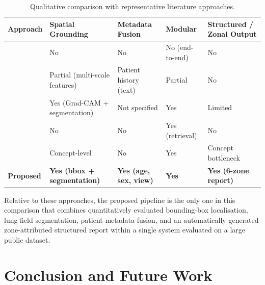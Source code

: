 \documentclass[preprint,12pt,authoryear]{elsarticle}
\begin{document}
\begin{table}[ht]
\centering
\caption{Qualitative comparison with representative literature approaches.}
\label{tab:qualitative_comparison}
\renewcommand{\arraystretch}{1.3}
\begin{tabular}{p{3.0cm}p{2.0cm}p{2.0cm}p{2.0cm}p{3.0cm}}
\toprule
\textbf{Approach} & \textbf{Spatial Grounding} & \textbf{Metadata Fusion} & \textbf{Modular} & \textbf{Structured / Zonal Output} \\
\midrule
\citet{yang_knowledge} & No & No & No (end-to-end) & No \\
\citet{mmg_fusion} & Partial (multi-scale features) & Patient history (text) & Partial & No \\
\citet{ihras} & Yes (Grad-CAM + segmentation) & Not specified & Yes & Limited \\
\citet{xrem} & No & No & Yes (retrieval) & No \\
\citet{concept_rag} & Concept-level & No & Yes & Concept bottleneck \\
\textbf{Proposed} & \textbf{Yes (bbox + segmentation)} & \textbf{Yes (age, sex, view)} & \textbf{Yes} & \textbf{Yes (6-zone report)} \\
\bottomrule
\end{tabular}
\end{table}

Relative to these approaches, the proposed pipeline is the only one in this comparison that combines quantitatively evaluated bounding-box localisation, lung-field segmentation, patient-metadata fusion, and an automatically generated zone-attributed structured report within a single system evaluated on a large public dataset.

\section{Conclusion and Future Work}
\label{sec:conclusion}
\end{document}
